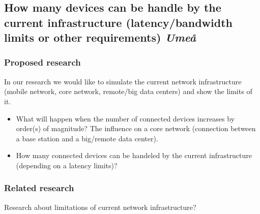 \subsection{How many devices can be handle by the current infrastructure (latency/bandwidth limits or other requirements) \emph{Umeå} }
\subsubsection{Proposed research}
In our research we would like to simulate the current network infrastructure (mobile network, core network, remote/big data centers) and show the limits of it.
\begin{itemize}
\item What will happen when the number of connected devices increases by order(s) of magnitude? The influence on a core network (connection between a base station and a big/remote data center).
\item How many connected devices can be handeled by the current infrastructure (depending on a latency limits)?
\end{itemize}
\subsubsection{Related research}
Research about limitations of current network infrastructure?